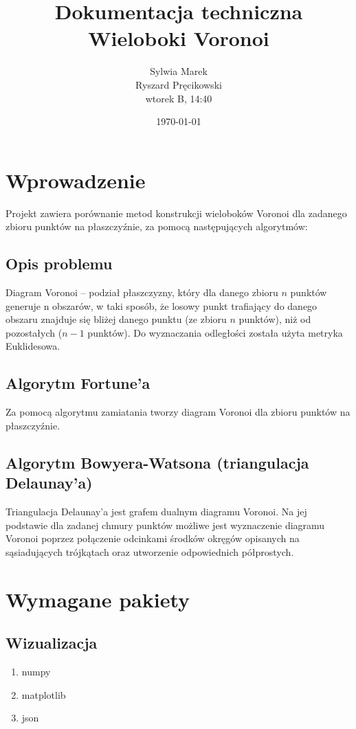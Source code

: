 \documentclass{article}
\title{Dokumentacja techniczna \\ \textbf{Wieloboki Voronoi}}
\author{Sylwia Marek \\ Ryszard Pręcikowski \\ \small{wtorek B, 14:40}}
\date{\today}
\begin{document}
\maketitle

\section{Wprowadzenie}
Projekt zawiera porównanie metod konstrukcji wieloboków Voronoi dla zadanego zbioru punktów na płaszczyźnie, za pomocą następujących algorytmów:
\subsection{Opis problemu}
Diagram Voronoi – podział płaszczyzny, który dla danego zbioru $n$ punktów generuje n obszarów, w taki sposób, że losowy punkt trafiający do danego obszaru znajduje się bliżej danego punktu (ze zbioru $n$ punktów), niż od pozostałych ($n-1$ punktów).
Do wyznaczania odległości została użyta metryka Euklidesowa.
\subsection{Algorytm Fortune'a}
Za pomocą algorytmu zamiatania tworzy diagram Voronoi dla zbioru punktów na płaszczyźnie.
\subsection{Algorytm Bowyera-Watsona (triangulacja Delaunay'a)}
Triangulacja Delaunay'a jest grafem dualnym diagramu Voronoi.
Na jej podstawie dla zadanej chmury punktów możliwe jest wyznaczenie diagramu Voronoi poprzez połączenie odcinkami środków okręgów opisanych na sąsiadujących trójkątach oraz utworzenie odpowiednich półprostych.


\section{Wymagane pakiety}
\subsection{Wizualizacja}
\begin{enumerate}
    \item numpy
    \item matplotlib
    \item json
\end{enumerate}
\end{document}

